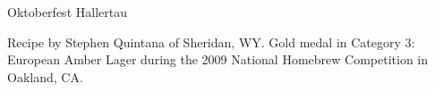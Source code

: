 \begin{recipe}{Oktoberfest Hallertau}

\begin{aboutblock}
Recipe by Stephen Quintana of Sheridan, WY. Gold medal in Category 3: European
Amber Lager during the 2009 National Homebrew Competition in Oakland, CA.
\sourceaha
\end{aboutblock}


\begin{methodandtiming}

\begin{mashsteps}
\end{mashsteps}

\begin{fermentationsteps}
\end{fermentationsteps}

\end{methodandtiming}

\recipebreak

\begin{ingredientsblock}

\begin{malts}
\end{malts}

\begin{hops}
\end{hops}


\end{ingredientsblock}

\end{recipe}


